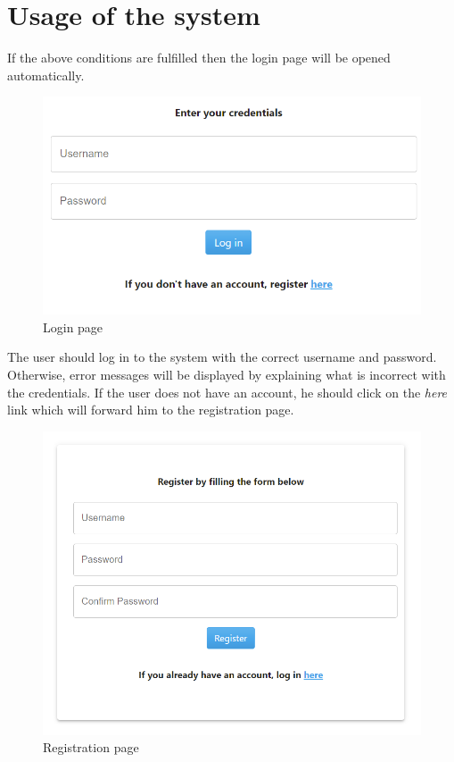 \section{Usage of the system}
\label{sec:usage-system}
If the above conditions are fulfilled then the login page will be opened automatically.

\begin{figure}[H]
	\centering
	\includegraphics[width=120mm]{images/login-3.png}
	\caption{Login page}
\end{figure}

The user should log in to the system with the correct username and password. Otherwise, error messages will be displayed by explaining what is incorrect with the credentials. If the user does not have an account, he should click on the \emph{here} link which will forward him to the registration page.

\begin{figure}[H]
	\centering
	\includegraphics[width=\textwidth]{images/registration.png}
	\caption{Registration page}
\end{figure}

